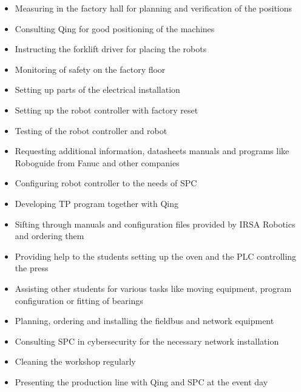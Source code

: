 \begin{itemize}
	\item Measuring in the factory hall for planning and verification of the positions
	\item Consulting Qing for good positioning of the machines
	\item Instructing the forklift driver for placing the robots
	\item Monitoring of safety on the factory floor
	\item Setting up parts of the electrical installation
	\item Setting up the robot controller with factory reset
	\item Testing of the robot controller and robot
	\item Requesting additional information, datasheets manuals and programs like Roboguide from Fanuc and other companies
	\item Configuring robot controller to the needs of SPC
	\item Developing TP program together with Qing
	\item Sifting through manuals and configuration files provided by IRSA Robotics and ordering them
	\item Providing help to the students setting up the oven and  the PLC controlling the press 
	\item Assisting other students for various tasks like moving equipment, program configuration or fitting of bearings
	\item Planning, ordering and installing the fieldbus and network equipment
	\item Consulting SPC in cybersecurity for the necessary network installation
	\item Cleaning the workshop regularly
	\item Presenting the production line with Qing and SPC at the event day
\end{itemize}